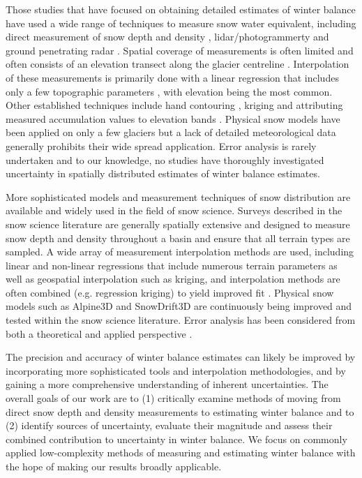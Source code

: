 \documentclass[twocolumn, letterpaper]{igs}
\begin{document}
Those studies that have focused on obtaining detailed estimates of winter balance have used a wide range of techniques to measure snow water equivalent, including direct measurement of snow depth and density \citep[e.g.][]{Cullen2017}, lidar/photogrammerty \citep[e.g.][]{Sold2013} and ground penetrating radar \citep[e.g.][]{Machguth2006, Gusmeroli2014, McGrath2015}. Spatial coverage of measurements is often limited and often consists of an elevation transect along the glacier centreline \citep[e.g.][]{Kaser2003, Machguth2006}. Interpolation of these measurements is primarily done with a linear regression that includes only a few topographic parameters \citep[e.g.][]{MacDougall2011}, with elevation being the most common. Other established techniques include hand contouring \citep[e.g.][]{Tangborn1975}, kriging \citep[e.g.][]{Hock1999} and attributing measured accumulation values to elevation bands \citep[e.g.][]{Thibert2008}. Physical snow models have been applied on only a few glaciers \citep[e.g.][]{Mott2008, Dadic2010} but a lack of detailed meteorological data generally prohibits their wide spread application. Error analysis is rarely undertaken and to our knowledge, no studies have thoroughly investigated uncertainty in spatially distributed estimates of winter balance estimates. 

More sophisticated models and measurement techniques of snow distribution are available and widely used in the field of snow science. Surveys described in the snow science literature are generally spatially extensive and designed to measure snow depth and density throughout a basin and ensure that all terrain types are sampled. A wide array of measurement interpolation methods are used, including linear \citep[e.g.][]{Lopez2010} and non-linear regressions \citep[e.g.][]{Molotch2005} that include numerous terrain parameters as well as geospatial interpolation \citep[e.g.][]{Erxleben2002} such as kriging, and interpolation methods are often combined (e.g. regression kriging) to yield improved fit \citep[e.g.][]{Balk2000}. Physical snow models such as Alpine3D \citep{Lehning2006} and SnowDrift3D \citep{Schneiderbauer2011} are continuously being improved and tested within the snow science literature. Error analysis has been considered from both a theoretical \citep[e.g.][]{Trujillo2015} and applied perspective \citep[e.g.][]{Turcan1975,Woo1978, Deems2006}. 

The precision and accuracy of winter balance estimates can likely be improved by incorporating more sophisticated tools and interpolation methodologies, and by gaining a more comprehensive understanding of inherent uncertainties. The overall goals of our work are to (1) critically examine methods of moving from direct snow depth and density measurements to estimating winter balance and to (2) identify sources of uncertainty, evaluate their magnitude and assess their combined contribution to uncertainty in winter balance. We focus on commonly applied low-complexity methods of measuring and estimating winter balance with the hope of making our results broadly applicable.
\end{document}
